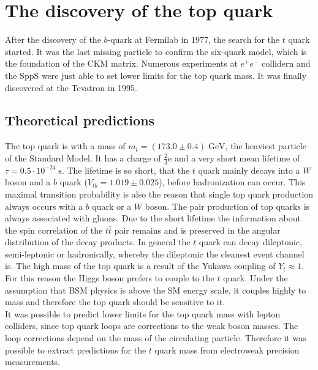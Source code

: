 \section{The discovery of the top quark \cite{top-quark}}
After the discovery of the $b$-quark at Fermilab in 1977, the search for the $t$ quark started. It was the last missing particle to confirm the six-quark model, which is the foundation of the CKM matrix. Numerous experiments at $e^+e^-$ collidern and the SppS were just able to set lower limits for the top quark mass. It was finally discovered at the Tevatron in 1995.
\subsection{Theoretical predictions}
The top quark is with a mass of $m_t=(173.0\pm0.4)\;\si{\GeV}$, the heaviest particle of the Standard Model. It has a charge of $\frac{2}{3}$e and a very short mean lifetime of $\tau = 0.5\cdot 10^{-24}\;\si{\second}$. The lifetime is so short, that the $t$ quark mainly decays into a $W$ boson and a $b$ quark ($V_{tb}= 1.019 \pm 0.025$), before hadronization can occur. This maximal transition probability is also the reason that single top quark production always occurs with a $b$ quark or a $W$ boson. The pair production of top quarks is always associated with gluons. Due to the short lifetime the information about the spin correlation of the $t\bar{t}$ pair remains and is preserved in the angular distribution of the decay products. In general the $t$ quark can decay dileptonic, semi-leptonic or hadronically, whereby the dileptonic the cleanest event channel is.
The high mass of the top quark is a result of the Yukawa coupling of $Y_t \approx 1$.
For this reason the Higgs boson prefers to couple to the $t$ quark. Under the assumption that BSM physics is above the SM energy scale, it couples highly to mass and therefore the top quark should be sensitive to it.\\
It was possible to predict lower limits for the top quark mass with lepton colliders, since top quark loops are corrections to the weak boson masses. The loop corrections depend on the mass of the circulating particle. Therefore it was possible to extract predictions for the $t$ quark mass from electroweak precision measurements.


